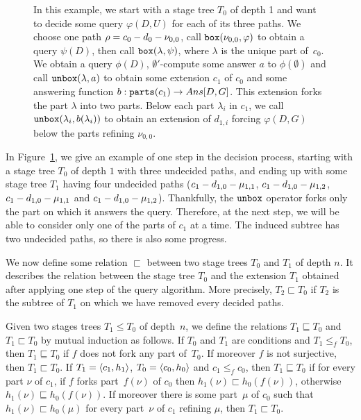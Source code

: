 \begin{figure}[htbp]
\begin{center}
{\begin{tikzpicture}
\end{tikzpicture}
}
\end{center}
\caption{In this example, we start with a stage tree $T_0$ of depth 1 and want to decide some query $\varphi(D,U)$
for each of its three paths. We choose one path $\rho = c_0 \-- d_0 \-- \nu_{0,0}$,
call $\boxop(\nu_{0,0}, \varphi)$ to obtain a query $\psi(D)$, then call $\boxop(\lambda, \psi)$,
where $\lambda$ is the unique part of~$c_0$.
We obtain a query $\phi(D)$, $\emptyset'$-compute some answer $a$ to $\phi(\emptyset)$
and call $\unboxop(\lambda, a)$ to obtain some extension $c_1$ of $c_0$ and some answering function $b : \parop(c_1) \to \ansop[D,G]$. This extension forks the part $\lambda$ into two parts. Below each part $\lambda_i$ in $c_1$, we call $\unboxop(\lambda_i, b(\lambda_i))$
to obtain an extension of $d_{1,i}$ forcing $\varphi(D,G)$ below the parts refining $\nu_{0,0}$.}
\label{fig:refinement-query-progress}
\end{figure}

In Figure~\ref{fig:refinement-query-progress}, we give an example of one step in the decision process,
starting with a stage tree $T_0$ of depth $1$ with three undecided paths, and ending up with
some stage tree $T_1$ having four undecided paths ($c_1 \-- d_{1,0} \-- \mu_{1,1}$, $c_1 \-- d_{1,0} \-- \mu_{1,2}$,
$c_1 \-- d_{1,0} \-- \mu_{1,1}$ and $c_1 \-- d_{1,0} \-- \mu_{1,2}$).
Thankfully, the $\unboxop$ operator forks only the part on which it answers the query. Therefore,
at the next step, we will be able to consider only one of the parts of $c_1$ at a time.
The induced subtree has two undecided paths, so there is also some progress.

We now define some relation $\sqsubset$ between two stage trees $T_0$ and $T_1$ of depth $n$.
It describes the relation between the stage tree $T_0$ and the extension $T_1$ obtained after
applying one step of the query algorithm. More precisely, $T_2 \sqsubset T_0$
if $T_2$ is the subtree of $T_1$ on which we have removed every decided paths.

\begin{definition}
Given two stages trees $T_1 \leq T_0$ of depth~$n$,
we define the relations $T_1 \sqsubseteq T_0$ and $T_1 \sqsubset T_0$ by mutual induction as follows.
If $T_0$ and $T_1$ are conditions and $T_1 \leq_f T_0$, then 
$T_1 \sqsubseteq T_0$ if $f$ does not fork any part of~$T_0$. 
If moreover $f$ is not surjective, then $T_1 \sqsubset T_0$.
If $T_1 = \tuple{c_1, h_1}$, $T_0 = \tuple{c_0, h_0}$ and $c_1 \leq_f c_0$,
then $T_1 \sqsubseteq T_0$ if for every part $\nu$ of $c_1$,
if $f$ forks part~$f(\nu)$ of $c_0$ then $h_1(\nu) \sqsubset h_0(f(\nu))$,
otherwise $h_1(\nu) \sqsubseteq h_0(f(\nu))$. If moreover there is some part~$\mu$ of $c_0$
such that $h_1(\nu) \sqsubset h_0(\mu)$ for every part~$\nu$ of $c_1$ refining $\mu$,
then $T_1 \sqsubset T_0$.
\end{definition}

